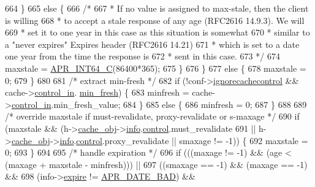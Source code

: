 \begin{DoxyCode}
{664         \}
665         \textcolor{keywordflow}{else} \{
666             \textcolor{comment}{/*}
667 \textcolor{comment}{             * If no value is assigned to max-stale, then the client is willing}
668 \textcolor{comment}{             * to accept a stale response of any age (RFC2616 14.9.3). We will}
669 \textcolor{comment}{             * set it to one year in this case as this situation is somewhat}
670 \textcolor{comment}{             * similar to a "never expires" Expires header (RFC2616 14.21)}
671 \textcolor{comment}{             * which is set to a date one year from the time the response is}
672 \textcolor{comment}{             * sent in this case.}
673 \textcolor{comment}{             */}
674             maxstale = \hyperlink{group__apr__platform_gaae749817bb595cd5dcb9c17c119ddb13}{APR\_INT64\_C}(86400*365);
675         \}
676     \}
677     \textcolor{keywordflow}{else} \{
678         maxstale = 0;
679     \}
680 
681     \textcolor{comment}{/* extract min-fresh */}
682     \textcolor{keywordflow}{if} (!conf->\hyperlink{structcache__server__conf_a2372aa3f5b681975bd629bb1c865735d}{ignorecachecontrol} && cache->\hyperlink{structcache__request__rec_aaea78b272eb05f1ba67a75bd6264b4df}{control\_in}.
      \hyperlink{structcache__control_aa2e69b28766eef731031b7b2d728273d}{min\_fresh}) \{
683         minfresh = cache->\hyperlink{structcache__request__rec_aaea78b272eb05f1ba67a75bd6264b4df}{control\_in}.min\_fresh\_value;
684     \}
685     \textcolor{keywordflow}{else} \{
686         minfresh = 0;
687     \}
688 
689     \textcolor{comment}{/* override maxstale if must-revalidate, proxy-revalidate or s-maxage */}
690     \textcolor{keywordflow}{if} (maxstale && (h->\hyperlink{structcache__handle_aea71e9fd166a32e0fe46a12668a1f3bd}{cache\_obj}->\hyperlink{structcache__object_ab4b2aae3e314dfa7abe8304c33cedb83}{info}.\hyperlink{structcache__info_ad13eba54e179bd5b57b7e97b219b3c67}{control}.must\_revalidate
691             || h->\hyperlink{structcache__handle_aea71e9fd166a32e0fe46a12668a1f3bd}{cache\_obj}->\hyperlink{structcache__object_ab4b2aae3e314dfa7abe8304c33cedb83}{info}.\hyperlink{structcache__info_ad13eba54e179bd5b57b7e97b219b3c67}{control}.proxy\_revalidate || smaxage != -1)) \{
692         maxstale = 0;
693     \}
694 
695     \textcolor{comment}{/* handle expiration */}
696     \textcolor{keywordflow}{if} (((maxage != -1) && (age < (maxage + maxstale - minfresh))) ||
697         ((smaxage == -1) && (maxage == -1) &&
698          (info->\hyperlink{structcache__info_acad1125058221e40207cc515f294d474}{expire} != \hyperlink{group__APR__Util__Date_ga8be88b25f4b477ad13c4067c959411b0}{APR\_DATE\_BAD}) &&
}
\end{DoxyCode}
